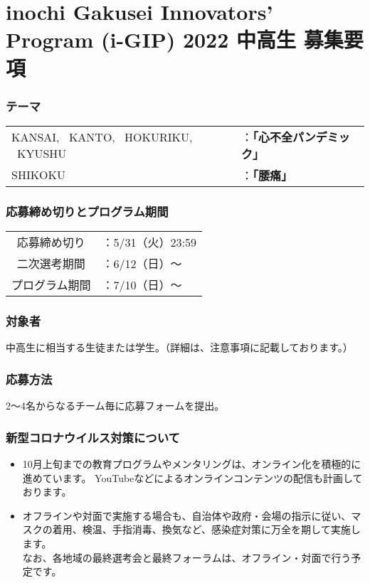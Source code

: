 \documentclass[10.5pt]{jsarticle}
\begin{document}
\part*{\bf \Huge inochi Gakusei Innovators' Program (i-GIP) 2022 中高生 募集要項}
\vspace{5mm}

\section{テーマ}
\begin{tabular}{ll}
KANSAI, \ KANTO, \ HOKURIKU, \ KYUSHU & ：\textbf{「心不全パンデミック」}\\
SHIKOKU &：\textbf{「腰痛」} \\
\end{tabular}

\section{応募締め切りとプログラム期間}
\begin{tabular}{cl}
応募締め切り &：5/31（火）23:59 \\
二次選考期間 &：6/12（日）～ \\
プログラム期間 &：7/10（日）～ \\
\end{tabular}

\section{対象者}
中高生に相当する生徒または学生。（詳細は、注意事項に記載しております。）

\section{応募方法}
2～4名からなるチーム毎に応募フォームを提出。

\section{新型コロナウイルス対策について}
\begin{itemize}
\item 10月上旬までの教育プログラムやメンタリングは、オンライン化を積極的に進めています。
YouTubeなどによるオンラインコンテンツの配信も計画しております。
\item オフラインや対面で実施する場合も、自治体や政府・会場の指示に従い、マスクの着用、検温、手指消毒、換気など、感染症対策に万全を期して実施します。\\
なお、各地域の最終選考会と最終フォーラムは、オフライン・対面で行う予定です。\\ 
\end{itemize}
\end{document}
